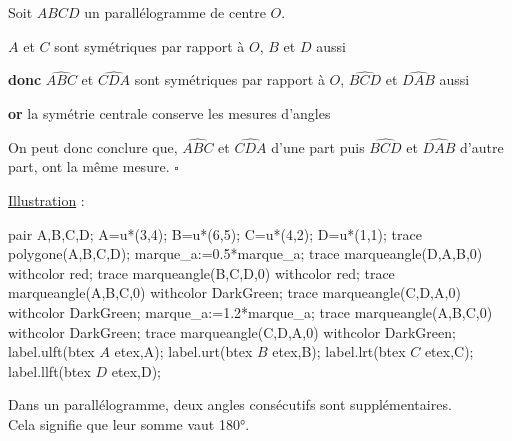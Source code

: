 \begin{changemargin}{0mm}{-15mm}
\begin{preuve}
        \begin{minipage}{0.65\linewidth}
            Soit $ABCD$ un parallélogramme de centre $O$.
            \par
            $A$ et $C$ sont symétriques par rapport à $O$, $B$ et $D$ aussi
            \par \textbf{donc} $\widehat{ABC}$ et $\widehat{CDA}$ sont symétriques par rapport à $O$, $\widehat{BCD}$ et $\widehat{DAB}$ aussi
            \par \textbf{or} la symétrie centrale conserve les mesures d'angles
            \par On peut donc conclure que, $\widehat{ABC}$ et $\widehat{CDA}$ d'une part puis $\widehat{BCD}$ et $\widehat{DAB}$ d'autre part, ont la même mesure. $\square$
        \end{minipage}
        \begin{minipage}{0.35\linewidth}
            \begin{center}
                \underline{Illustration} :\par
                \begin{Geometrie}[CoinHD={(7u,6u)}]
                    pair A,B,C,D;
                    A=u*(3,4);
                    B=u*(6,5);
                    C=u*(4,2);
                    D=u*(1,1);
                    trace polygone(A,B,C,D);
                    marque_a:=0.5*marque_a;
                    trace marqueangle(D,A,B,0) withcolor red;
                    trace marqueangle(B,C,D,0) withcolor red;
                    trace marqueangle(A,B,C,0) withcolor DarkGreen;
                    trace marqueangle(C,D,A,0) withcolor DarkGreen;
                    marque_a:=1.2*marque_a;
                    trace marqueangle(A,B,C,0) withcolor DarkGreen;
                    trace marqueangle(C,D,A,0) withcolor DarkGreen;
                    label.ulft(btex $A$ etex,A);
                    label.urt(btex $B$ etex,B);
                    label.lrt(btex $C$ etex,C);
                    label.llft(btex $D$ etex,D);
                \end{Geometrie} 
            \end{center}
        \end{minipage}
    \end{preuve}
    \begin{propriete}[\admise]
        Dans un parallélogramme, deux angles consécutifs sont supplémentaires. \\
        Cela signifie que leur somme vaut \ang{180}.
    \end{propriete}
\end{changemargin}
 
